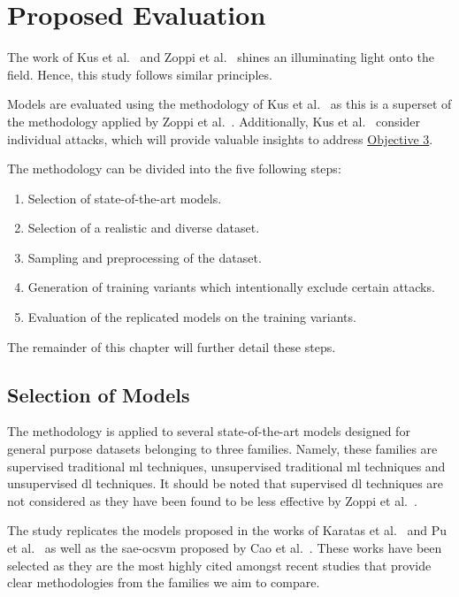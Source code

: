 \chapter{Proposed Evaluation}%
\label{chp:evaluation}

The work of Kus et al.~\cite{Kus} and Zoppi et al.~\cite{Zoppi} shines an
illuminating light onto the field. Hence, this study follows similar
principles.

Models are evaluated using the methodology of Kus et al.~\cite{Kus} as this is
a superset of the methodology applied by Zoppi et al.~\cite{Zoppi}.
Additionally, Kus et al.~\cite{Kus} consider individual attacks, which will
provide valuable insights to address \hyperlink{obj3}{Objective 3}.

The methodology can be divided into the five following steps:
\begin{enumerate}
      \item Selection of state-of-the-art models.
      \item Selection of a realistic and diverse dataset.
      \item Sampling and preprocessing of the dataset.
      \item Generation of training variants which intentionally exclude certain attacks.
      \item Evaluation of the replicated models on the training variants.
\end{enumerate}
The remainder of this chapter will further detail these steps.

\section{Selection of Models}%
\label{sec:models}

The methodology is applied to several state-of-the-art models designed for
general purpose datasets belonging to three families. Namely, these families
are supervised traditional \gls{ml} techniques, unsupervised traditional
\gls{ml} techniques and unsupervised \gls{dl} techniques. It should be noted
that supervised \gls{dl} techniques are not considered as they have been found
to be less effective by Zoppi et al.~\cite{Zoppi}.

The study replicates the models proposed in the works of Karatas et
al.~\cite{Karatas} and Pu et al.~\cite{Pu} as well as the \gls{sae}-\gls{ocsvm}
proposed by Cao et al.~\cite{Cao}. These works have been selected as they are
the most highly cited amongst recent studies that provide clear methodologies
from the families we aim to compare.

